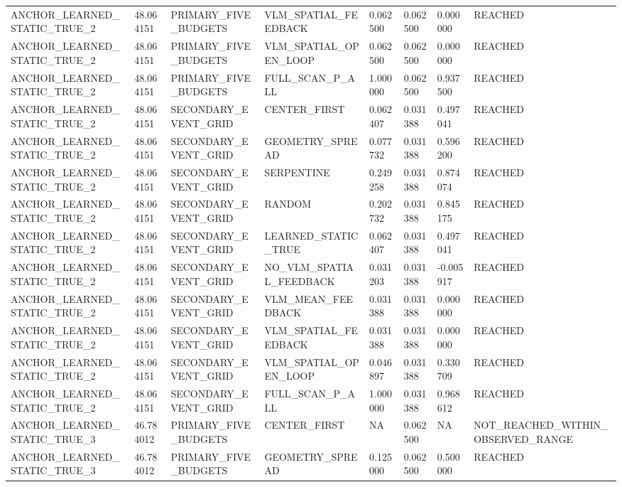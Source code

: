 \begin{tabular}{llllllll}
ANCHOR\_LEARNED\_STATIC\_TRUE\_2 & 48.064151 & PRIMARY\_FIVE\_BUDGETS & VLM\_SPATIAL\_FEEDBACK & 0.062500 & 0.062500 & 0.000000 & REACHED \\
ANCHOR\_LEARNED\_STATIC\_TRUE\_2 & 48.064151 & PRIMARY\_FIVE\_BUDGETS & VLM\_SPATIAL\_OPEN\_LOOP & 0.062500 & 0.062500 & 0.000000 & REACHED \\
ANCHOR\_LEARNED\_STATIC\_TRUE\_2 & 48.064151 & PRIMARY\_FIVE\_BUDGETS & FULL\_SCAN\_P\_ALL & 1.000000 & 0.062500 & 0.937500 & REACHED \\
ANCHOR\_LEARNED\_STATIC\_TRUE\_2 & 48.064151 & SECONDARY\_EVENT\_GRID & CENTER\_FIRST & 0.062407 & 0.031388 & 0.497041 & REACHED \\
ANCHOR\_LEARNED\_STATIC\_TRUE\_2 & 48.064151 & SECONDARY\_EVENT\_GRID & GEOMETRY\_SPREAD & 0.077732 & 0.031388 & 0.596200 & REACHED \\
ANCHOR\_LEARNED\_STATIC\_TRUE\_2 & 48.064151 & SECONDARY\_EVENT\_GRID & SERPENTINE & 0.249258 & 0.031388 & 0.874074 & REACHED \\
ANCHOR\_LEARNED\_STATIC\_TRUE\_2 & 48.064151 & SECONDARY\_EVENT\_GRID & RANDOM & 0.202732 & 0.031388 & 0.845175 & REACHED \\
ANCHOR\_LEARNED\_STATIC\_TRUE\_2 & 48.064151 & SECONDARY\_EVENT\_GRID & LEARNED\_STATIC\_TRUE & 0.062407 & 0.031388 & 0.497041 & REACHED \\
ANCHOR\_LEARNED\_STATIC\_TRUE\_2 & 48.064151 & SECONDARY\_EVENT\_GRID & NO\_VLM\_SPATIAL\_FEEDBACK & 0.031203 & 0.031388 & -0.005917 & REACHED \\
ANCHOR\_LEARNED\_STATIC\_TRUE\_2 & 48.064151 & SECONDARY\_EVENT\_GRID & VLM\_MEAN\_FEEDBACK & 0.031388 & 0.031388 & 0.000000 & REACHED \\
ANCHOR\_LEARNED\_STATIC\_TRUE\_2 & 48.064151 & SECONDARY\_EVENT\_GRID & VLM\_SPATIAL\_FEEDBACK & 0.031388 & 0.031388 & 0.000000 & REACHED \\
ANCHOR\_LEARNED\_STATIC\_TRUE\_2 & 48.064151 & SECONDARY\_EVENT\_GRID & VLM\_SPATIAL\_OPEN\_LOOP & 0.046897 & 0.031388 & 0.330709 & REACHED \\
ANCHOR\_LEARNED\_STATIC\_TRUE\_2 & 48.064151 & SECONDARY\_EVENT\_GRID & FULL\_SCAN\_P\_ALL & 1.000000 & 0.031388 & 0.968612 & REACHED \\
ANCHOR\_LEARNED\_STATIC\_TRUE\_3 & 46.784012 & PRIMARY\_FIVE\_BUDGETS & CENTER\_FIRST & NA & 0.062500 & NA & NOT\_REACHED\_WITHIN\_OBSERVED\_RANGE \\
ANCHOR\_LEARNED\_STATIC\_TRUE\_3 & 46.784012 & PRIMARY\_FIVE\_BUDGETS & GEOMETRY\_SPREAD & 0.125000 & 0.062500 & 0.500000 & REACHED \\

\end{tabular}
